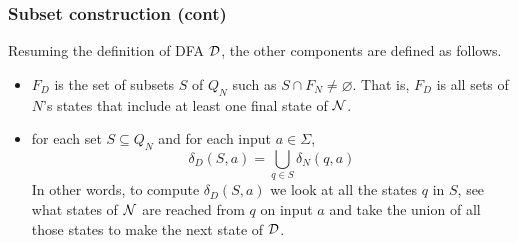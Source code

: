 %
\begin{frame}
\frametitle{Subset construction (cont)}

Resuming the definition of DFA \({\cal D}\), the other components are
defined as follows.
\begin{itemize}

  \item \(F_D\) is the set of subsets \(S\) of \(Q_N\) such as \(S
  \cap F_N \neq \varnothing\). That is, \(F_D\) is all sets of \(N\)'s
  states that include at least one final state of \({\cal N}\).

  \item for each set \(S \subseteq Q_N\) and for each input \(a \in
  \Sigma\),
  \[
    \delta_D(S, a) = \bigcup_{q \in S}{\delta_N (q, a)}
  \]
  In other words, to compute \(\delta_D (S, a)\) we look at all the
  states \(q\) in \(S\), see what states of \({\cal N}\) are reached
  from \(q\) on input \(a\) and take the union of all those states to
  make the next state of \({\cal D}\).

\end{itemize}

\end{frame}


